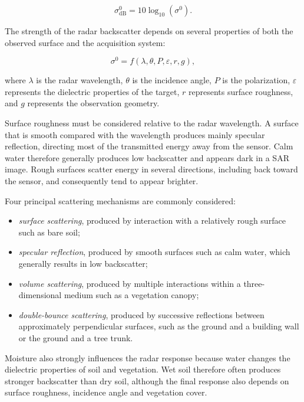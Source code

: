 \documentclass[11pt,a4paper]{article}
\begin{document}
\[
\sigma^0_{\mathrm{dB}}
=
10\log_{10}\left(\sigma^0\right).
\]

The strength of the radar backscatter depends on several properties of
both the observed surface and the acquisition system:

\[
\sigma^0 =
f\left(
\lambda,
\theta,
P,
\varepsilon,
r,
g
\right),
\]

where \(\lambda\) is the radar wavelength, \(\theta\) is the incidence
angle, \(P\) is the polarization, \(\varepsilon\) represents the
dielectric properties of the target, \(r\) represents surface roughness,
and \(g\) represents the observation geometry.

Surface roughness must be considered relative to the radar wavelength.
A surface that is smooth compared with the wavelength produces mainly
specular reflection, directing most of the transmitted energy away from
the sensor. Calm water therefore generally produces low backscatter and
appears dark in a SAR image. Rough surfaces scatter energy in several
directions, including back toward the sensor, and consequently tend to
appear brighter.

Four principal scattering mechanisms are commonly considered:

\begin{itemize}
    \item \textit{surface scattering}, produced by interaction with a
    relatively rough surface such as bare soil;

    \item \textit{specular reflection}, produced by smooth surfaces such
    as calm water, which generally results in low backscatter;

    \item \textit{volume scattering}, produced by multiple interactions
    within a three-dimensional medium such as a vegetation canopy;

    \item \textit{double-bounce scattering}, produced by successive
    reflections between approximately perpendicular surfaces, such as
    the ground and a building wall or the ground and a tree trunk.
\end{itemize}

Moisture also strongly influences the radar response because water
changes the dielectric properties of soil and vegetation. Wet soil
therefore often produces stronger backscatter than dry soil, although
the final response also depends on surface roughness, incidence angle
and vegetation cover.
\end{document}
